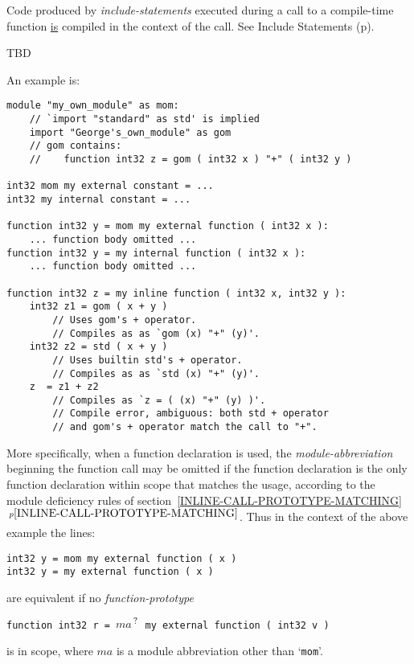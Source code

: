 \documentclass[12pt]{article}
\newcommand{\QMARK}{{$^{\,\mbox{\footnotesize ?}}$}}
\newcommand{\itemref}[1]{\ref{#1}$\,^{p\pageref{#1}}$}
\newcommand{\pagref}[1]{p\pageref{#1}}
\newenvironment{indpar}[1][0.3in]%
	{\begin{list}{}%
		     {\setlength{\itemsep}{0in}%
		      \setlength{\topsep}{0in}%
		      \setlength{\parsep}{1ex}%
		      \setlength{\labelwidth}{#1}%
		      \setlength{\leftmargin}{#1}%
		      \addtolength{\leftmargin}{\labelsep}}%
	 \item}%
	{\end{list}}
\begin{document}
Code produced by {\em include-statements} executed during a call to a
compile-time function
\underline{is} compiled in the context of the call.
See Include Statements (\pagref{INCLUDE-STATEMENTS}).

TBD

An example is:
\begin{indpar}\begin{verbatim}
module "my_own_module" as mom:
    // `import "standard" as std' is implied
    import "George's_own_module" as gom
    // gom contains:
    //    function int32 z = gom ( int32 x ) "+" ( int32 y )

int32 mom my external constant = ...
int32 my internal constant = ...

function int32 y = mom my external function ( int32 x ):
    ... function body omitted ...
function int32 y = my internal function ( int32 x ):
    ... function body omitted ...

function int32 z = my inline function ( int32 x, int32 y ):
    int32 z1 = gom ( x + y )
        // Uses gom's + operator.
        // Compiles as as `gom (x) "+" (y)'.
    int32 z2 = std ( x + y )
        // Uses builtin std's + operator.
        // Compiles as as `std (x) "+" (y)'.
    z  = z1 + z2 
        // Compiles as `z = ( (x) "+" (y) )'.
        // Compile error, ambiguous: both std + operator
        // and gom's + operator match the call to "+".
\end{verbatim}\end{indpar}\label{EXTERNAL-INTERNAL-EXAMPLE}

More specifically,
when a function declaration is used, the {\em module-abbreviation}
beginning the function call may be omitted if the function declaration is
the only function declaration within scope that matches the usage,
according to the module deficiency rules of
section~\itemref{INLINE-CALL-PROTOTYPE-MATCHING}.
Thus in the context of the above example the lines:
\begin{indpar}\begin{verbatim}
int32 y = mom my external function ( x )
int32 y = my external function ( x )
\end{verbatim}\end{indpar}
are equivalent if no {\em function-prototype}
\begin{center}
\tt function int32 r = $ma$\QMARK{} my external function ( int32 v )
\end{center}
is in scope, where $ma$ is a module abbreviation other than `{\tt mom}'.
\end{document}
